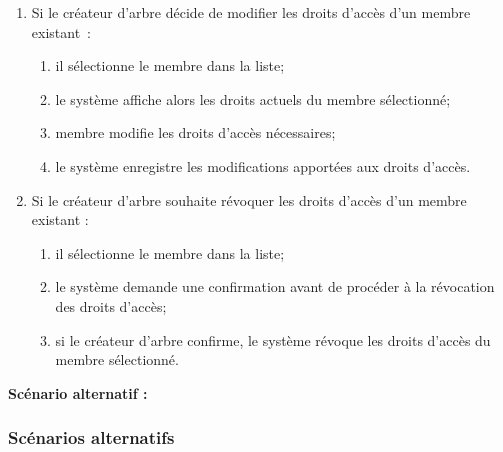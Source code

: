 \begin{enumerate}
  \item Si le créateur d'arbre décide de modifier les droits d'accès d'un membre existant :
    \begin{enumerate}
      \item il sélectionne le membre dans la liste;
      \item le système affiche alors les droits actuels du membre sélectionné;
      \item membre modifie les droits d'accès nécessaires;
      \item le système enregistre les modifications apportées aux droits d'accès.
    \end{enumerate}

  \item Si le créateur d'arbre souhaite révoquer les droits d'accès d'un membre existant :
    \begin{enumerate}
      \item il sélectionne le membre dans la liste;
      \item le système demande une confirmation avant de procéder à la révocation des droits d'accès;
      \item si le créateur d'arbre confirme, le système révoque les droits d'accès du membre sélectionné.
    \end{enumerate}

\end{enumerate}

\textbf{Scénario alternatif :}

\subsubsection*{Scénarios alternatifs}

